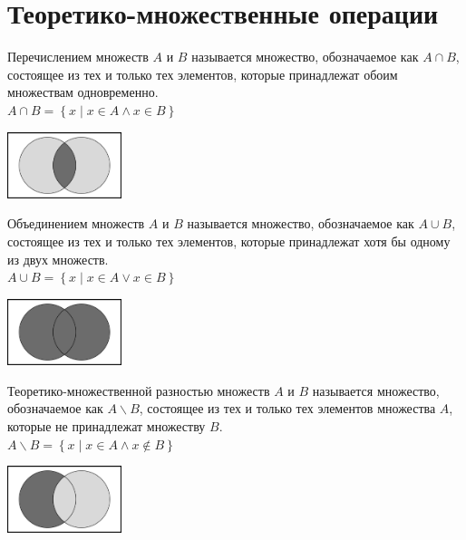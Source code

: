 \section{Теоретико-множественные операции}

\begin{definition}
    Перечислением множеств $A$ и $B$ называется множество, обозначаемое как $A \cap B$, состоящее из тех и только тех элементов, 
    которые принадлежат обоим множествам одновременно. \\ 

    $A \cap B = \left\{ x \mid x \in A \land x \in B \right\}$

    \begin{center}
        \includegraphics[width=0.25\textwidth]{tex/chapter_2/assets/Intersection.png}\\
    \end{center}
\end{definition}

\begin{definition}
    Объединением множеств $A$ и $B$ называется множество, обозначаемое как $A \cup B$, состоящее из тех и только тех элементов, 
    которые принадлежат хотя бы одному из двух множеств. \\ 

    $A \cup B = \left\{ x \mid x \in A \lor x \in B \right\}$

    \begin{center}
        \includegraphics[width=0.25\textwidth]{tex/chapter_2/assets/Union.png}\\
    \end{center}
\end{definition}

\begin{definition}
    Теоретико-множественной разностью множеств $A$ и $B$ называется множество, обозначаемое как $A \backslash B$, состоящее из тех и только тех элементов 
    множества $A$, которые не принадлежат множеству $B$. \\ 

    $A \backslash B = \left\{ x \mid x \in A \land x \notin B \right\}$

    \begin{center}
        \includegraphics[width=0.25\textwidth]{tex/chapter_2/assets/Subtraction.png}\\
    \end{center}
\end{definition}